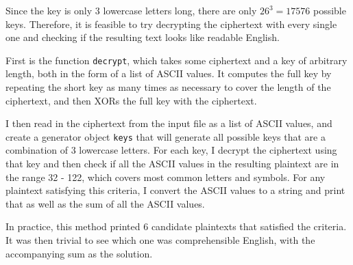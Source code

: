 \documentclass[11pt]{amsart}
\begin{document}
Since the key is only 3 lowercase letters long, there are only $26^3 = 17576$ possible keys. Therefore, it is feasible to try decrypting the ciphertext with every single one and checking if the resulting text looks like readable English. 

First is the function \verb!decrypt!, which takes some ciphertext and a key of arbitrary length, both in the form of a list of ASCII values. It computes the full key by repeating the short key as many times as necessary to cover the length of the ciphertext, and then XORs the full key with the ciphertext.

I then read in the ciphertext from the input file as a list of ASCII values, and create a generator object \verb!keys! that will generate all possible keys that are a combination of 3 lowercase letters. For each key, I decrypt the ciphertext using that key and then check if all the ASCII values in the resulting plaintext are in the range 32 - 122, which covers most common letters and symbols. For any plaintext satisfying this criteria, I convert the ASCII values to a string and print that as well as the sum of all the ASCII values.

In practice, this method printed 6 candidate plaintexts that satisfied the criteria. It was then trivial to see which one was comprehensible English, with the accompanying sum as the solution.
\end{document}
